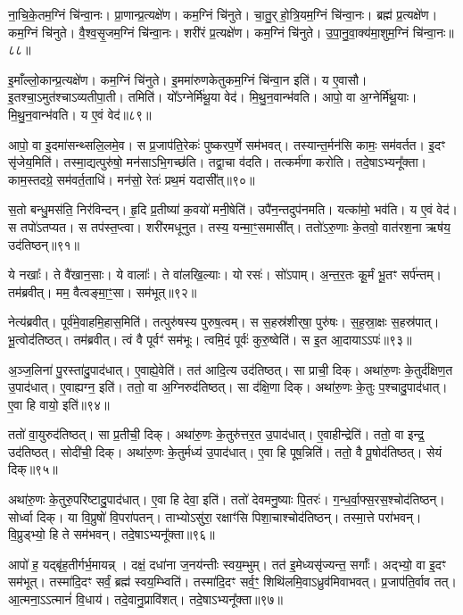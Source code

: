 ना॒चि॒के॒तम॒ग्निं चि॑न्वा॒नः। 
प्रा॒णान्प्र॒त्यक्षे॑ण। कम॒ग्निं चि॑नुते। चा॒तु॒र्‌हो॒त्रि॒य\-म॒ग्निं चि॑न्वा॒नः। 
ब्रह्म॑ प्र॒त्यक्षे॑ण। कम॒ग्निं चि॑नुते। वै॒श्व॒सृ॒जम॒ग्निं चि॑न्वा॒नः। 
शरी॑रं प्र॒त्यक्षे॑ण। कम॒ग्निं चि॑नुते। उ॒पा॒नु॒वा॒क्य॑\-मा॒शुम॒ग्निं चि॑न्वा॒नः॥८८॥


इ॒माँल्लो॒कान्प्र॒त्यक्षे॑ण। कम॒ग्निं चि॑नुते। 
इ॒ममा॑रुणकेतुकम॒ग्निं चि॑न्वा॒न इति॑। य ए॒वासौ। 
इ॒तश्चा॒ऽमुत॑श्चाऽव्यतीपा॒ती। तमिति॑। 
यो᳚ऽग्नेर्मि॑थू॒या वेद॑। मि॒थु॒न॒वान्भ॑वति। 
आपो॒ वा अ॒ग्नेर्मि॑थू॒याः। मि॒थु॒न॒वान्भ॑वति। य ए॒वं वेद॑॥८९॥\anuvakamend


आपो॒ वा इ॒दमा॑सन्थ्सलि॒लमे॒व। स प्र॒जाप॑ति॒रेकः॑ पुष्करप॒र्णे सम॑भवत्। 
तस्यान्त॒र्मन॑सि कामः॒ सम॑वर्तत। इ॒दꣳ सृ॑जेय॒मिति॑। 
तस्मा॒द्यत्पुरु॑षो॒ मन॑साऽभि॒गच्छ॑ति। तद्वा॒चा व॑दति। 
तत्कर्म॑णा करोति। तदे॒षाऽभ्यनू᳚क्ता। 
काम॒स्तदग्रे॒ सम॑वर्त॒ताधि॑। मन॑सो॒ रेतः॑ प्रथ॒मं यदासी᳚त्॥९०॥


स॒तो बन्धु॒मस॑ति॒ निर॑विन्दन्। हृ॒दि प्र॒तीष्या॑ क॒वयो॑ मनी॒षेति॑। 
उपै॑न॒न्तदुप॑नमति। यत्का॑मो॒ भव॑ति। य ए॒वं वेद॑। 
स तपो॑ऽतप्यत। स तप॑स्त॒प्त्वा। शरी॑रमधूनुत। तस्य॒ यन्मा॒ꣳ॒समासी᳚त्। 
ततो॑ऽरु॒णाः के॒तवो॒ वात॑रश॒ना ऋष॑य॒ उद॑तिष्ठन्॥९१॥


ये नखाः᳚। ते वै॑खान॒साः। ये वालाः᳚। ते वा॑लखि॒ल्याः। 
यो रसः॑। सो॑ऽपाम्। अ॒न्त॒र॒तः कू॒र्मं भू॒तꣳ सर्प॑न्तम्। 
तम॑ब्रवीत्। मम॒ वैत्वङ्मा॒ꣳ॒सा। सम॑भूत्॥९२॥


नेत्य॑ब्रवीत्। पूर्व॑मे॒वाहमि॒हास॒मिति॑। 
तत्पुरु॑षस्य पुरुष॒त्वम्। स स॒हस्र॑शीर्‌षा॒ पुरु॑षः। 
स॒ह॒स्रा॒क्षः स॒हस्र॑पात्। भू॒त्वोद॑तिष्ठत्। 
तम॑ब्रवीत्। त्वं वै पूर्वꣳ॑ सम॑भूः। 
त्वमि॒दं पूर्वः॑ कुरु॒ष्वेति॑। स इ॒त आ॒दायाऽऽपः॑॥९३॥


अ॒ञ्ज॒लिना॑ पु॒रस्ता॑दु॒पाद॑धात्। ए॒वाह्ये॒वेति॑। 
तत॑ आदि॒त्य उद॑तिष्ठत्। सा प्राची॒ दिक्। 
अथा॑रु॒णः के॒तुर्द॑क्षिण॒त उ॒पाद॑धात्। 
ए॒वाह्यग्न॒ इति॑। ततो॒ वा अ॒ग्निरुद॑तिष्ठत्। 
सा द॑क्षि॒णा दिक्। अथा॑रु॒णः के॒तुः प॒श्चादु॒पाद॑धात्। 
ए॒वा हि वायो॒ इति॑॥९४॥


ततो॑ वा॒युरुद॑तिष्ठत्। सा प्र॒तीची॒ दिक्। 
अथा॑रु॒णः के॒तुरु॑त्तर॒त उ॒पाद॑धात्। ए॒वाहीन्द्रेति॑। 
ततो॒ वा इन्द्र॒ उद॑तिष्ठत्। सोदी॑ची॒ दिक्। 
अथा॑रु॒णः के॒तुर्मध्य॑ उ॒पाद॑धात्। ए॒वा हि पूष॒न्निति॑। 
ततो॒ वै पू॒षोद॑तिष्ठत्। सेयं दिक्॥९५॥


अथा॑रु॒णः के॒तुरु॒परि॑ष्टादु॒पाद॑धात्। ए॒वा हि देवा॒ इति॑। 
ततो॑ देवमनु॒ष्याः पि॒तरः॑। ग॒न्ध॒र्वा॒फ्स॒रस॒श्चोद॑तिष्ठन्। 
सोर्ध्वा दिक्। या वि॒प्रुषो॑ वि॒परा॑पतन्। 
ताभ्योऽसु॑रा॒ रक्षाꣳ॑सि पिशा॒चाश्चोद॑तिष्ठन्। तस्मा॒त्ते परा॑भवन्। 
वि॒प्रुड्भ्यो॒ हि ते सम॑भवन्। तदे॒षाऽभ्यनू᳚क्ता॥९६॥


आपो॑ ह॒ यद्बृ॑ह॒तीर्गर्भ॒मायन्न्। दक्षं॒ दधा॑ना ज॒नय॑न्तीः स्वय॒म्भुम्। 
तत॑ इ॒मेध्यसृ॑ज्यन्त॒ सर्गाः᳚। अद्भ्यो॒ वा इ॒दꣳ सम॑भूत्। 
तस्मा॑दि॒दꣳ सर्वं॒ ब्रह्म॑ स्वय॒म्भ्विति॑। 
तस्मा॑दि॒दꣳ सर्व॒ꣳ॒ शिथि॑लमि॒वाऽध्रुव॑मिवाभवत्। 
प्र॒जाप॑ति॒र्वाव तत्। आ॒त्मना॒ऽऽत्मानं॑ वि॒धाय॑। 
तदे॒वानु॒प्रावि॑शत्। तदे॒षाऽभ्यनू᳚क्ता॥९७॥


